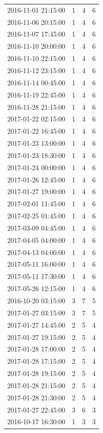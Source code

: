 \begin{tabular}{lrrr}
2016-11-01 21:15:00 & 1 & 4 & 6 \\
2016-11-06 20:15:00 & 1 & 4 & 6 \\
2016-11-07 17:45:00 & 1 & 4 & 6 \\
2016-11-10 20:00:00 & 1 & 4 & 6 \\
2016-11-10 22:15:00 & 1 & 4 & 6 \\
2016-11-12 23:15:00 & 1 & 4 & 6 \\
2016-11-14 00:45:00 & 1 & 4 & 6 \\
2016-11-19 22:45:00 & 1 & 4 & 6 \\
2016-11-28 21:15:00 & 1 & 4 & 6 \\
2017-01-22 02:15:00 & 1 & 4 & 6 \\
2017-01-22 16:45:00 & 1 & 4 & 6 \\
2017-01-23 13:00:00 & 1 & 4 & 6 \\
2017-01-23 18:30:00 & 1 & 4 & 6 \\
2017-01-24 00:00:00 & 1 & 4 & 6 \\
2017-01-26 12:45:00 & 1 & 4 & 6 \\
2017-01-27 19:00:00 & 1 & 4 & 6 \\
2017-02-01 11:45:00 & 1 & 4 & 6 \\
2017-02-25 01:45:00 & 1 & 4 & 6 \\
2017-03-09 04:45:00 & 1 & 4 & 6 \\
2017-04-05 04:00:00 & 1 & 4 & 6 \\
2017-04-13 04:00:00 & 1 & 4 & 6 \\
2017-05-11 16:00:00 & 1 & 4 & 6 \\
2017-05-11 17:30:00 & 1 & 4 & 6 \\
2017-05-26 12:15:00 & 1 & 4 & 6 \\
2016-10-20 03:15:00 & 3 & 7 & 5 \\
2017-01-27 03:15:00 & 3 & 7 & 5 \\
2017-01-27 14:45:00 & 2 & 5 & 4 \\
2017-01-27 19:15:00 & 2 & 5 & 4 \\
2017-01-28 17:00:00 & 2 & 5 & 4 \\
2017-01-28 17:15:00 & 2 & 5 & 4 \\
2017-01-28 19:15:00 & 2 & 5 & 4 \\
2017-01-28 21:15:00 & 2 & 5 & 4 \\
2017-01-28 21:30:00 & 2 & 5 & 4 \\
2017-01-27 22:45:00 & 3 & 6 & 3 \\
2016-10-17 16:30:00 & 1 & 3 & 3 \\

\end{tabular}

